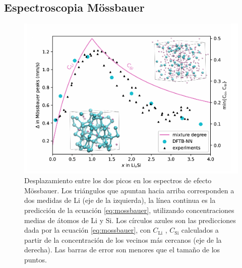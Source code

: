 \subsection{Espectroscopia Mössbauer}

\begin{figure}[h!]
    \centering
    \includegraphics[width=.7\textwidth]{Silicio/prediccion/resultados/mossbauer/mossbauer.png}
    \caption{Desplazamiento entre los dos picos en los espectros de efecto 
    Mössbauer. Los triángulos que apuntan hacia arriba corresponden a dos 
    medidas de Li  (eje de la izquierda), la línea continua es la 
    predicción de la ecuación \ref{eq:mossbauer}, utilizando concentraciones 
    medias de átomos de Li y Si. Los círculos azules son las predicciones dada 
    por la ecuación \ref{eq:mossbauer}, con $C_{\text{Li}}$ , $C_{\text{Si}}$ 
    calculados a partir de la concentración de los vecinos más cercanos (eje de 
    la derecha). Las barras de error son menores que el tamaño de los puntos.}
    \label{fig:mossbauer}
\end{figure}

